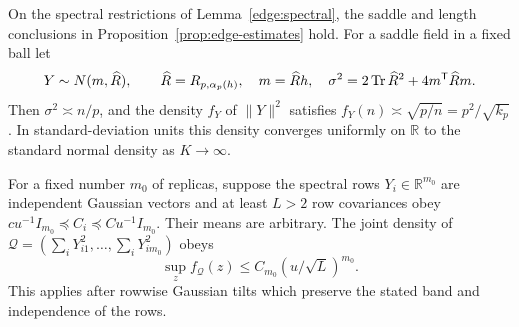 \begin{lemma}
\label{edge:norm-density}
On the spectral restrictions of Lemma~\ref{edge:spectral}, the saddle
and length conclusions in Proposition~\ref{prop:edge-estimates} hold.
For a saddle field in a fixed ball let
\[
 Y\sim N(m,\widehat R),\qquad \widehat R=R_{p,\alpha_p(h)},\quad m=\widehat Rh,\quad
 \sigma^2=2\operatorname{Tr}\widehat R^2+4m^{\mathsf T}\widehat Rm.
\]
Then \(\sigma^2\asymp n/p\), and the density \(f_Y\) of \(\|Y\|^2\)
satisfies \(f_Y(n)\asymp\sqrt{p/n}=p^2/\sqrt{k_p}\).
In standard-deviation units this density converges uniformly on
\(\mathbb R\) to the standard normal density as \(K\to\infty\).

For a fixed number \(m_0\) of replicas, suppose the spectral rows
\(Y_i\in\mathbb R^{m_0}\) are independent Gaussian vectors and at least
\(L>2\) row covariances obey
\(cu^{-1}I_{m_0}\preceq C_i\preceq Cu^{-1}I_{m_0}\).
Their means are arbitrary.  The joint density of
\(\mathcal Q=(\sum_iY_{i1}^2,\ldots,\sum_iY_{im_0}^2)\) obeys
\begin{equation}\label{edge:replica-norm-density}
 \sup_z f_{\mathcal Q}(z)\le C_{m_0}(u/\sqrt L)^{m_0}.
\end{equation}
This applies after rowwise Gaussian tilts which preserve the stated band
and independence of the rows.
\end{lemma}

